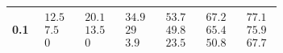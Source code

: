 \documentclass{article}
\begin{document}
\begin{table}[htbp]
\begin{tabular}{ccccccc}
0.1 &
$\begin{matrix}12.5\\7.5\\0\end{matrix}$ &
$\begin{matrix}20.1\\13.5\\0\end{matrix}$ &
$\begin{matrix}34.9\\29\\3.9\end{matrix}$ &
$\begin{matrix}53.7\\49.8\\23.5\end{matrix}$ &
$\begin{matrix}67.2\\65.4\\50.8\end{matrix}$ &
$\begin{matrix}77.1\\75.9\\67.7\end{matrix}$
\\[3pt]\hline

\end{tabular}
\end{table}
\end{document}
